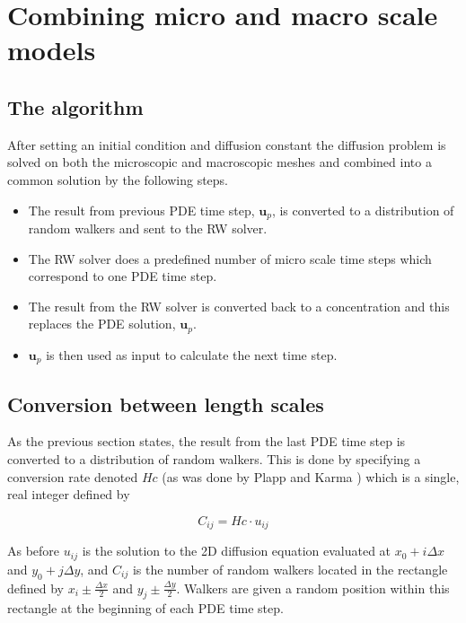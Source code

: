 \section{Combining micro and macro scale models}

\subsection{The algorithm}
After setting an initial condition and diffusion constant the diffusion problem is solved on both the microscopic and macroscopic meshes and combined into a common solution by the following steps.
\begin{itemize}
 \item The result from previous PDE time step, $\mathbf{u}_p$, is converted to a distribution of random walkers and sent to the RW solver.
 \item The RW solver does a predefined number of micro scale time steps which correspond to one PDE time step.
 \item The result from the RW solver is converted back to a concentration and this replaces the PDE solution, $\mathbf{u}_p$.
 \item $\mathbf{u}_p$ is then used as input to calculate the next time step.
\end{itemize}

\subsection{Conversion between length scales}
As the previous section states, the result from the last PDE time step is converted to a distribution of random walkers. 
This is done by specifying a conversion rate denoted $Hc$ (as was done by Plapp and Karma \cite{plapp2000multiscale}) which is a single, real integer defined by

\begin{equation}\label{theory:Hc_definition}
 C_{ij} = Hc\cdot u_{ij}
\end{equation}

\noindent As before $u_{ij}$ is the solution to the 2D diffusion equation evaluated at $x_0 +i\Delta x$ and $y_0 +j\Delta y$, and $C_{ij}$ is the number of random walkers located in the rectangle defined by $x_i\pm\frac{\Delta x}{2}$ and $y_j\pm\frac{\Delta y}{2}$. 
Walkers are given a random position within this rectangle at the beginning of each PDE time step.

